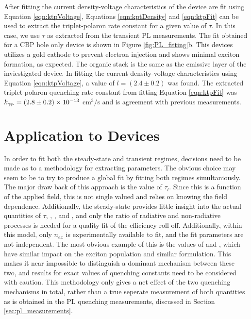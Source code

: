 \documentclass[../thesis.tex]{subfiles}
\begin{document}
After fitting the current density-voltage characteristics of the device are fit using Equation \ref{eqn:ktpVoltage}, Equations \ref{eqn:kptDensity} and \ref{eqn:ktpFit} can be used to extract the triplet-polaron rate constant for a given value of $\tau$.  
In this case, we use $\tau$ as extracted from the transient PL measurements.
The fit obtained for a CBP \irppy hole only device is shown in Figure \ref{fig:PL_fitting}b.
This devices utilizes a gold cathode to prevent electron injection and shows minimal exciton formation, as expected.
The organic stack is the same as the emissive layer of the inviestigated device.  
In fitting the current density-voltage characteristics using Equation \ref{eqn:ktpVoltage}, a value of $l=(2.4\pm0.2)$ was found.  
The extracted triplet-polaron quenching rate constant from fitting Equation \ref{eqn:ktpFit} was $k_{_\text{\tiny TP}}=(2.8\pm0.2)\times 10^{-13}$ cm$^3$/s and is agreement with previous measurements.\cite{Erickson2014,Reineke2007}


\section{Application to Devices}

In order to fit both the steady-state and transient regimes, decisions need to be made as to a methodology for extracting parameters.  
The obvious choice may seem to be to try to produce a global fit by fitting both regimes simultaniously.  
The major draw back of this approach is the value of $\tau_l$.  
Since this is a function of the applied field, this is not single valued and relies on knowing the field dependence.
Additionally, the steady-state provides little insight into the actual quantities of $\tau$, \ktt, \ktp, and \kf, and only the ratio of radiative and non-radiative processes is needed for a quality fit of the efficiency roll-off.
Additionally, within this model, only $n_{ex}$ is experimentally available to fit, and the fit parameters are not independent.
The most obvious example of this is the values of \ktt and \ktp, which have similar impact on the exciton population and similar formulation.  
This makes it near impossible to distinguish a dominant mechanism between these two, and results for exact values of quenching constants need to be considered with caution.
This methodology only gives a net effect of the two quenching mechanisms in total, rather than a true seperate measurement of both quantities as is obtained in the PL quenching measurements, discussed in Section \ref{sec:pl_measurements}.
\end{document}

